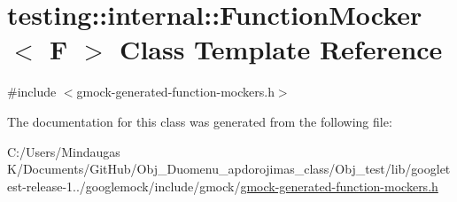 \hypertarget{classtesting_1_1internal_1_1_function_mocker}{}\section{testing\+::internal\+::Function\+Mocker$<$ F $>$ Class Template Reference}
\label{classtesting_1_1internal_1_1_function_mocker}


{\ttfamily \#include $<$gmock-\/generated-\/function-\/mockers.\+h$>$}



The documentation for this class was generated from the following file\+:\begin{DoxyCompactItemize}
\item 
C\+:/\+Users/\+Mindaugas K/\+Documents/\+Git\+Hub/\+Obj\+\_\+\+Duomenu\+\_\+apdorojimas\+\_\+class/\+Obj\+\_\+test/lib/googletest-\/release-\/1../googlemock/include/gmock/\mbox{\hyperlink{_obj__test_2lib_2googletest-release-1_88_81_2googlemock_2include_2gmock_2gmock-generated-function-mockers_8h}{gmock-\/generated-\/function-\/mockers.\+h}}\end{DoxyCompactItemize}
